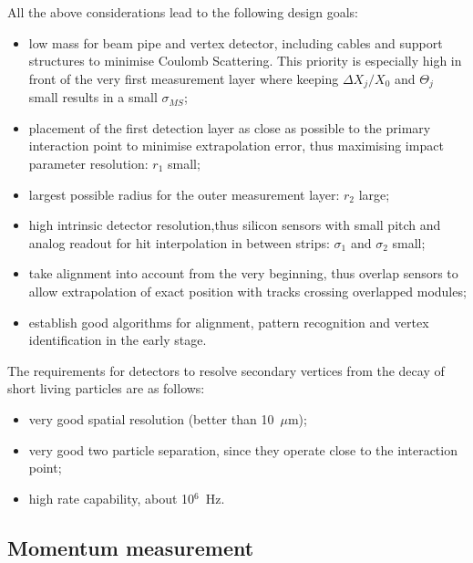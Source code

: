 All the above considerations lead to the following design goals:
\begin{itemize}
\item low mass for beam pipe and vertex detector, including cables and support
  structures to minimise Coulomb Scattering. This priority is especially high in
  front of the very first measurement layer where keeping $\Delta X_{j}/X_{0}$
  and $\Theta_{j}$ small results in a small $\sigma_{MS}$;
\item placement of the first detection layer as close as possible to the primary
  interaction point to minimise extrapolation error, thus maximising impact
  parameter resolution: $r_{1}$ small;
\item largest possible radius for the outer measurement layer: $r_{2}$ large;
\item high intrinsic detector resolution,thus silicon sensors with small pitch
  and analog readout for hit interpolation in between strips: $\sigma_{1}$ and
  $\sigma_{2}$ small;
\item take alignment into account from the very beginning, thus overlap sensors
  to allow extrapolation of exact position with tracks crossing overlapped
  modules;
\item establish good algorithms for alignment, pattern recognition and vertex
  identification in the early stage.
\end{itemize}


The requirements for detectors to resolve secondary vertices from the decay of
short living particles are as follows:
\begin{itemize}
\item very good spatial resolution (better than 10~$\mu$m);
\item very good two particle separation, since they operate close to the
  interaction point;
\item high rate capability, about 10$^{6}$~Hz.
\end{itemize}





\noindent







\subsection{Momentum measurement}

